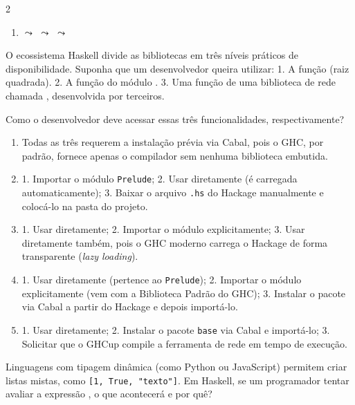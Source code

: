 \documentclass[a4paper,10pt,brazil]{article}
\begin{document}
\begin{multicols}{2}
\begin{enumerate}
  \item {} $\leadsto$  $\leadsto$  $\leadsto$ 


\end{enumerate}

O ecossistema Haskell divide as bibliotecas em três níveis práticos de disponibilidade. Suponha que um desenvolvedor queira utilizar:
1. A função  (raiz quadrada).
2. A função  do módulo .
3. Uma função de uma biblioteca de rede chamada , desenvolvida por terceiros.

Como o desenvolvedor deve acessar essas três funcionalidades, respectivamente?

\begin{enumerate}
  \item Todas as três requerem a instalação prévia via Cabal, pois o GHC, por padrão, fornece apenas o compilador sem nenhuma biblioteca embutida.

  \item 1. Importar o módulo \texttt{Prelude}; 2. Usar diretamente (é carregada automaticamente); 3. Baixar o arquivo \texttt{.hs} do Hackage manualmente e colocá-lo na pasta do projeto.

  \item 1. Usar diretamente; 2. Importar o módulo explicitamente; 3. Usar diretamente também, pois o GHC moderno carrega o Hackage de forma transparente (\emph{lazy loading}).

  \item 1. Usar diretamente (pertence ao \texttt{Prelude}); 2. Importar o módulo explicitamente (vem com a Biblioteca Padrão do GHC); 3. Instalar o pacote via Cabal a partir do Hackage e depois importá-lo.

  \item 1. Usar diretamente; 2. Instalar o pacote \texttt{base} via Cabal e importá-lo; 3. Solicitar que o GHCup compile a ferramenta de rede em tempo de execução.


\end{enumerate}

Linguagens com tipagem dinâmica (como Python ou JavaScript) permitem criar listas mistas, como \texttt{[1, True, "texto"]}. Em Haskell, se um programador tentar avaliar a expressão , o que acontecerá e por quê?


\end{multicols}
\end{document}
